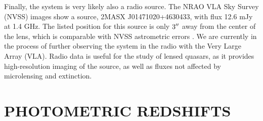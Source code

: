 \documentclass[manuscript]{aastex}
\begin{document}
Finally, the system is very likely also a radio source. The NRAO VLA Sky Survey (NVSS) images show a source, 2MASX J01471020+4630433, with flux 12.6 mJy at 1.4 GHz. The listed position for this source is only $3\mbox{$^{\prime\prime}$}$ away from the center of the lens, which is comparable with NVSS astrometric errors \citep{con98}. We are currently in the process of further observing the system in the radio with the Very Large Array (VLA). Radio data is useful for the study of lensed quasars, as it provides high-resolution imaging of the source, as well as fluxes not affected by microlensing and extinction.


\section{PHOTOMETRIC REDSHIFTS}
\end{document}
